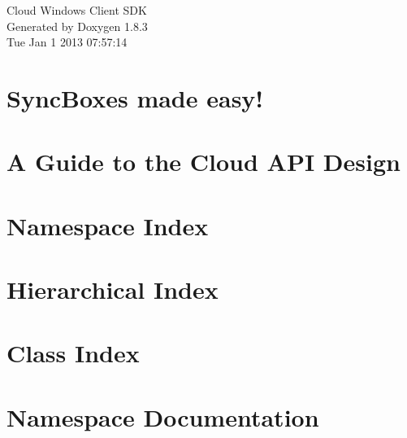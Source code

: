 \documentclass{book}
\begin{document}
\hypersetup{pageanchor=false,citecolor=blue}
\begin{titlepage}
\vspace*{7cm}
\begin{center}
{\Large Cloud Windows Client S\-D\-K }\\
\vspace*{1cm}
{\large Generated by Doxygen 1.8.3}\\
\vspace*{0.5cm}
{\small Tue Jan 1 2013 07:57:14}\\
\end{center}
\end{titlepage}
\clearemptydoublepage
{}
\tableofcontents
\clearemptydoublepage
{}
\hypersetup{pageanchor=true,citecolor=blue}
\chapter{Sync\-Boxes made easy!}
\label{index}\hypertarget{index}{}
\chapter{A Guide to the Cloud A\-P\-I Design}
\label{DevOnlyPage1}
\hypertarget{DevOnlyPage1}{}

\chapter{Namespace Index}

\chapter{Hierarchical Index}

\chapter{Class Index}

\chapter{Namespace Documentation}





















\end{document}
